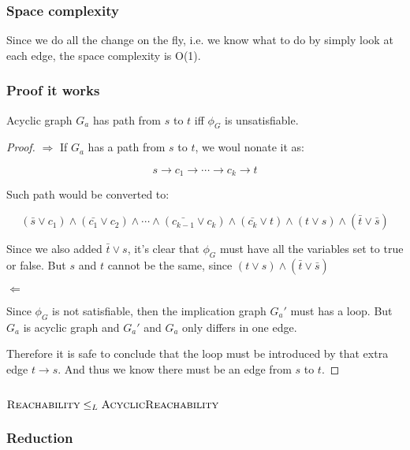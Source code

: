 \subsubsection*{Space complexity}

Since we do all the change on the fly, i.e. we know what to do by simply look at each edge, the space complexity is O(1).

\subsubsection*{Proof it works}

\begin{theorem}
    Acyclic graph $G_a$ has path from $s$ to $t$ iff $\phi_G$ is unsatisfiable.
\end{theorem}
\begin{proof}
    $\Rightarrow$ If $G_a$ has a path from $s$ to $t$, we woul nonate it as:

    $$s \rightarrow c_1 \rightarrow \cdots \rightarrow c_k \rightarrow t$$

    Such path would be converted to:

    $$(\bar{s} \vee c_1) \wedge (\bar{c_1} \vee c_2) \wedge \cdots \wedge (\bar{c_{k-1}} \vee c_k) \wedge (\bar{c_k} \vee t) \wedge (t \vee s) \wedge (\bar{t} \vee \bar{s})$$

    Since we also added $\bar{t} \vee s$, it's clear that $\phi_G$ must have all the variables set to true or false.
    But $s$ and $t$ cannot be the same, since $(t \vee s) \wedge (\bar{t} \vee \bar{s})$

    $\Leftarrow$

    Since $\phi_G$ is not satisfiable, then the implication graph $G_a'$ must has a loop.
    But $G_a$ is acyclic graph and $G_a'$ and $G_a$ only differs in one edge.

    Therefore it is safe to conclude that the loop must be introduced by that extra edge $t \rightarrow s$.
    And thus we know there must be an edge from $s$ to $t$.
\end{proof}

\subsection*{$\textsc{Reachability} \le_L \textsc{AcyclicReachability}$}

\subsubsection*{Reduction}

